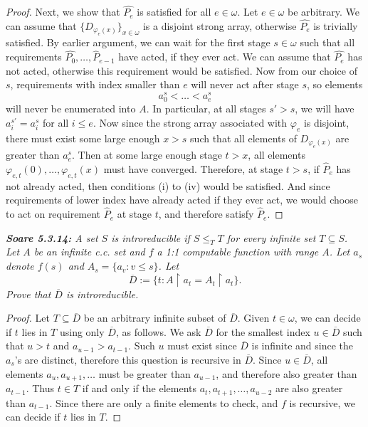 \documentclass{article}
\begin{document}
\begin{proof}
    Next, we show that $\hat{P_e}$ is satisfied for all $e\in\omega$. Let
    $e\in\omega$ be arbitrary. We can assume that
    $\{D_{\varphi_e(x)}\}_{x\in\omega}$ is a disjoint strong array,
    otherwise $\hat{P_e}$ is trivially satisfied. By earlier argument, we
    can wait for the first stage $s\in\omega$ such that all requirements
    $\hat{P_0},\ldots,\hat{P}_{e-1}$ have acted, if they ever act. We can
    assume that $\hat{P_e}$ has not acted, otherwise this requirement would
    be satisfied. Now from our choice of $s$, requirements with index
    smaller than $e$ will never act after stage $s$, so elements
    \[a_0^s<\ldots<a_e^s\] will never be enumerated into $A$. In
    particular, at all stages $s'>s$, we will have $a_i^{s'}=a_i^s$ for all
    $i\leq e$. Now since the strong array associated with $\varphi_e$ is
    disjoint, there must exist some large enough $x>s$ such that all
    elements of $D_{\varphi_e(x)}$ are greater than $a_e^s$. Then at some
    large enough stage $t>x$, all elements
    $\varphi_{e,t}(0),\ldots,\varphi_{e,t}(x)$ must have converged.
    Therefore, at stage $t>s$, if $\hat{P}_e$ has not already acted, then
    conditions (i) to (iv) would be satisfied. And since requirements of
    lower index have already acted if they ever act, we would choose to
    act on requirement $\hat{P}_e$ at stage $t$, and therefore satisfy
    $\hat{P}_e$.
  \end{proof}

\it \textbf{Soare 5.3.14:} A set $S$ is introreducible if $S\leq_T T$ for
  every infinite set $T\subseteq S$. Let $A$ be an infinite c.c. set and
  $f$ a 1:1 computable function with range $A$. Let $a_s$ denote $f(s)$ and
  $A_s=\{a_v:v\leq s\}$. Let
  \[\overline{D} :=\{t: A\restriction a_t =A_t\restriction a_t\}.\]
  Prove that $\overline{D}$ is introreducible.

  \begin{proof}
    Let $T\subseteq\overline{D}$ be an arbitrary infinite subset of
    $\overline{D}$. Given $t\in\omega$, we can decide if $t$ lies in $T$
    using only $\overline{D}$, as follows. We ask $\overline{D}$ for the
    smallest index $u\in\overline{D}$ such that $u>t$ and
    $a_{u-1}>a_{t-1}$. Such $u$ must exist since $\overline{D}$ is infinite
    and since the $a_s$'s are distinct, therefore this question is
    recursive in $\overline{D}$. Since $u\in\overline{D}$, all elements
    $a_u,a_{u+1},\ldots$ must be greater than $a_{u-1}$, and therefore also
    greater than $a_{t-1}$. Thus $t\in T$ if and only if the elements
    $a_t,a_{t+1},\ldots,a_{u-2}$ are also greater than $a_{t-1}$.  Since
    there are only a finite elements to check, and $f$ is recursive, we can
    decide if $t$ lies in $T$.
  \end{proof}
\end{document}
